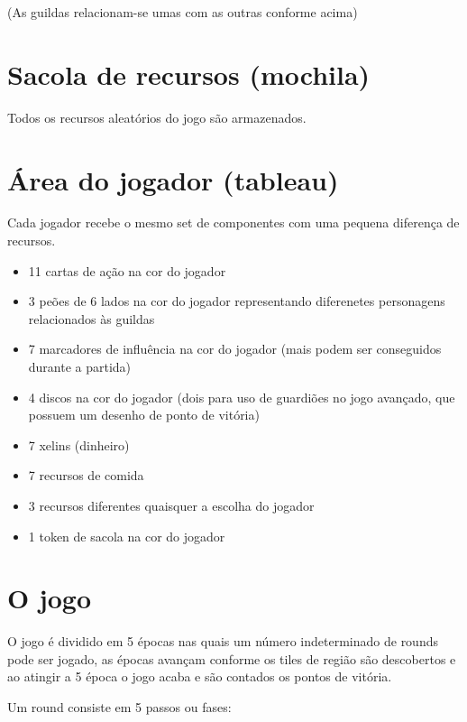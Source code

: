 \documentclass[11pt]{article}
\begin{document}
(As guildas relacionam-se umas com as outras conforme acima)

\section{Sacola de recursos (mochila)}
\label{sec:orgheadline3}

Todos os recursos aleatórios do jogo são armazenados.

\section{Área do jogador (tableau)}
\label{sec:orgheadline4}

Cada jogador recebe o mesmo set de componentes com uma pequena diferença de recursos.

\begin{itemize}
\item 11 cartas de ação na cor do jogador
\item 3 peões de 6 lados na cor do jogador representando diferenetes personagens relacionados às guildas
\item 7 marcadores de influência na cor do jogador (mais podem ser conseguidos durante a partida)
\item 4 discos na cor do jogador (dois para uso de guardiões no jogo avançado, que possuem um desenho de ponto de vitória)
\item 7 xelins (dinheiro)
\item 7 recursos de comida
\item 3 recursos diferentes quaisquer a escolha do jogador
\item 1 token de sacola na cor do jogador
\end{itemize}

\section{O jogo}
\label{sec:orgheadline5}

O jogo é dividido em 5 épocas nas quais um número indeterminado de rounds pode ser jogado, as épocas avançam conforme os tiles de região são descobertos e ao atingir a 5 época o jogo acaba e são contados os pontos de vitória.


Um round consiste em 5 passos ou fases:
\end{document}

